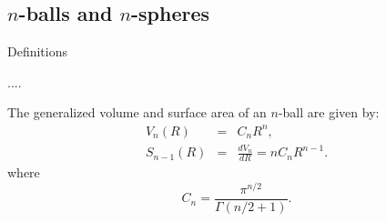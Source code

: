 \subsection{$n$-balls and $n$-spheres}

Definitions

....


The generalized volume and surface area of an $n$-ball are given by:
\begin{eqnarray}
V_n(R) & = & C_n R^n,
 \label{eq:gen_vol} \\
S_{n-1}(R) & = & \frac{dV_n}{dR} = n C_n R^{n-1}.
 \label{eq:gen_surf}
\end{eqnarray}
where
\begin{equation}
 \label{eq:cn}
  C_n = \frac{ \pi^{n/2} }{\Gamma(n/2 + 1)}.
\end{equation}


